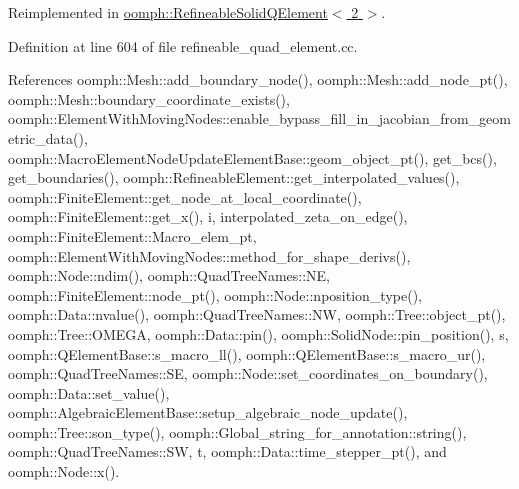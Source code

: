 Reimplemented in \hyperlink{classoomph_1_1RefineableSolidQElement_3_012_01_4_abebfabc831b862c49dc181ada6a7ca05}{oomph\+::\+Refineable\+Solid\+Q\+Element$<$ 2 $>$}.



Definition at line 604 of file refineable\+\_\+quad\+\_\+element.\+cc.



References oomph\+::\+Mesh\+::add\+\_\+boundary\+\_\+node(), oomph\+::\+Mesh\+::add\+\_\+node\+\_\+pt(), oomph\+::\+Mesh\+::boundary\+\_\+coordinate\+\_\+exists(), oomph\+::\+Element\+With\+Moving\+Nodes\+::enable\+\_\+bypass\+\_\+fill\+\_\+in\+\_\+jacobian\+\_\+from\+\_\+geometric\+\_\+data(), oomph\+::\+Macro\+Element\+Node\+Update\+Element\+Base\+::geom\+\_\+object\+\_\+pt(), get\+\_\+bcs(), get\+\_\+boundaries(), oomph\+::\+Refineable\+Element\+::get\+\_\+interpolated\+\_\+values(), oomph\+::\+Finite\+Element\+::get\+\_\+node\+\_\+at\+\_\+local\+\_\+coordinate(), oomph\+::\+Finite\+Element\+::get\+\_\+x(), i, interpolated\+\_\+zeta\+\_\+on\+\_\+edge(), oomph\+::\+Finite\+Element\+::\+Macro\+\_\+elem\+\_\+pt, oomph\+::\+Element\+With\+Moving\+Nodes\+::method\+\_\+for\+\_\+shape\+\_\+derivs(), oomph\+::\+Node\+::ndim(), oomph\+::\+Quad\+Tree\+Names\+::\+NE, oomph\+::\+Finite\+Element\+::node\+\_\+pt(), oomph\+::\+Node\+::nposition\+\_\+type(), oomph\+::\+Data\+::nvalue(), oomph\+::\+Quad\+Tree\+Names\+::\+NW, oomph\+::\+Tree\+::object\+\_\+pt(), oomph\+::\+Tree\+::\+O\+M\+E\+GA, oomph\+::\+Data\+::pin(), oomph\+::\+Solid\+Node\+::pin\+\_\+position(), s, oomph\+::\+Q\+Element\+Base\+::s\+\_\+macro\+\_\+ll(), oomph\+::\+Q\+Element\+Base\+::s\+\_\+macro\+\_\+ur(), oomph\+::\+Quad\+Tree\+Names\+::\+SE, oomph\+::\+Node\+::set\+\_\+coordinates\+\_\+on\+\_\+boundary(), oomph\+::\+Data\+::set\+\_\+value(), oomph\+::\+Algebraic\+Element\+Base\+::setup\+\_\+algebraic\+\_\+node\+\_\+update(), oomph\+::\+Tree\+::son\+\_\+type(), oomph\+::\+Global\+\_\+string\+\_\+for\+\_\+annotation\+::string(), oomph\+::\+Quad\+Tree\+Names\+::\+SW, t, oomph\+::\+Data\+::time\+\_\+stepper\+\_\+pt(), and oomph\+::\+Node\+::x().

\mbox{\label{classoomph_1_1RefineableQElement_3_012_01_4_a8f06b44d8fc378c3a3e256c9181e6b50}} 
